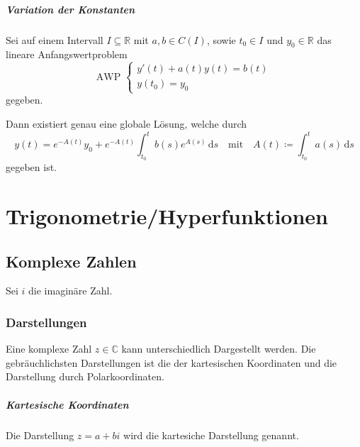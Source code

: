 	\paragraph{Variation der Konstanten}
		Sei auf einem Intervall $ I \subseteq \mathbb{R} $ mit $ a, b \in C(I) $, sowie $ t _ 0 \in I $ und $ y _ 0 \in \mathbb{R} $ das lineare Anfangswertproblem
		\begin{equation*}
			\text{AWP }
			\begin{cases}
				y'(t) + a(t)y(t) = b(t) \\
				y(t _ 0) = y _ 0
			\end{cases}
		\end{equation*}
		gegeben.

		Dann existiert genau eine globale Lösung, welche durch
		\begin{equation*}
			y(t) = e ^ { -A(t) } y _ 0 + e ^ { -A(t) } \int _ { t _ 0 } ^ t \! b(s) e ^ { A(s) } \, \mathrm{d}s \quad\text{mit}\quad A(t) \coloneqq \int _ { t _ 0 } ^ t \! a(s) \, \mathrm{d}s
		\end{equation*}
		gegeben ist.

	\paragraph{}

\chapter{Trigonometrie/Hyperfunktionen}
	\section{Komplexe Zahlen}
		Sei $ i $ die imaginäre Zahl.

		\subsection{Darstellungen}
			Eine komplexe Zahl $ z \in \mathbb{C} $ kann unterschiedlich Dargestellt werden. Die gebräuchlichsten Darstellungen ist die der kartesischen Koordinaten und die Darstellung durch Polarkoordinaten.

			\paragraph{Kartesische Koordinaten}
				Die Darstellung $ z = a + bi $ wird die kartesiche Darstellung genannt.

